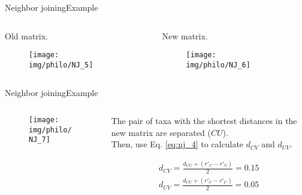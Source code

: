 \documentclass[10pt]{beamer}
\newcommand{\1}{
	\setbeamertemplate{background}{
		\texttt{[image: img/1]}
		\tikz[overlay] \fill[fill opacity=0.75,fill=white] (0,0) rectangle (-\paperwidth,\paperheight);
	}
}
\begin{document}
\begin{frame}{Neighbor joining}{Example}	
	\begin{columns}
		\begin{column}{0.48\textwidth}
			Old matrix.
			\begin{figure}
				\texttt{[image: img/philo/NJ\_5]}
			\end{figure}
		\end{column}
		\begin{column}{0.48\textwidth}
			New matrix.
			\begin{figure}
				\texttt{[image: img/philo/NJ\_6]}
			\end{figure}	
		\end{column}
	\end{columns}
\end{frame}

\begin{frame}{Neighbor joining}{Example}	
	\begin{columns}
		\begin{column}{0.48\textwidth}
			\begin{figure}
				\texttt{[image: img/philo/NJ\_7]}
			\end{figure}
		\end{column}
		\begin{column}{0.48\textwidth}
			The pair of taxa with the shortest distances in the new matrix are separated ($CU$). \\
			
			Then, use Eq. \ref{eq:nj_4} to calculate $d_{CV}$ and $d_{UV}$.
			
			\begin{equation*}
			\begin{split}				
			d_{CV} = \frac{ d_{CU} + ( r'_C - r'_U ) }{2} = 0.15 \\
			d_{UV} = \frac{ d_{CU} + ( r'_U - r'_C ) }{2} = 0.05 \\
			\end{split}
			\end{equation*} 
		\end{column}
	\end{columns}
\end{frame}
\end{document}
